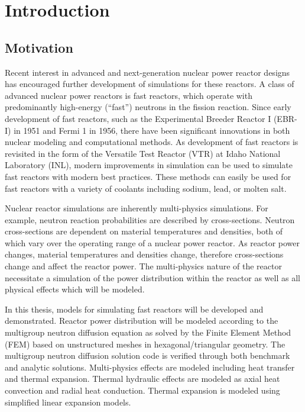 \chapter{Introduction}
\label{ch:introduction}

\section{Motivation}
  Recent interest in advanced and next-generation nuclear power reactor designs 
  has encouraged further development of simulations for these reactors. A class 
  of advanced nuclear power reactors is fast reactors, which operate with 
  predominantly high-energy (``fast'') neutrons in the fission reaction. Since 
  early development of fast reactors, such as the Experimental Breeder Reactor I
  (EBR-I) in 1951 and Fermi 1 in 1956, there have been significant innovations 
  in both nuclear modeling and computational methods. As development of fast
  reactors is revisited in the form of the Versatile Test Reactor (VTR) at Idaho 
  National Laboratory (INL), modern improvements in simulation can be used to 
  simulate fast reactors with modern best practices. These methods can easily be 
  used for fast reactors with a variety of coolants including sodium, lead, or 
  molten salt.

  Nuclear reactor simulations are inherently multi-physics simulations. For
  example, neutron reaction probabilities are described by cross-sections.
  Neutron cross-sections are dependent on material temperatures and densities,
  both of which vary over the operating range of a nuclear power reactor. As
  reactor power changes, material temperatures and densities change, therefore
  cross-sections change and affect the reactor power. The multi-physics nature
  of the reactor necessitate a simulation of the power distribution within the
  reactor as well as all physical effects which will be modeled. 
  
  In this thesis, models for simulating fast reactors will be developed and 
  demonstrated.  Reactor power distribution will be modeled according to the 
  multigroup neutron diffusion equation as solved by the Finite Element Method 
  (FEM) based on unstructured meshes in hexagonal/triangular geometry. The 
  multigroup neutron diffusion solution code is verified through both 
  benchmark and analytic solutions. Multi-physics effects are modeled including 
  heat transfer and thermal expansion. Thermal hydraulic effects are modeled as 
  axial heat convection and radial heat conduction. Thermal expansion is modeled 
  using simplified linear expansion models.


